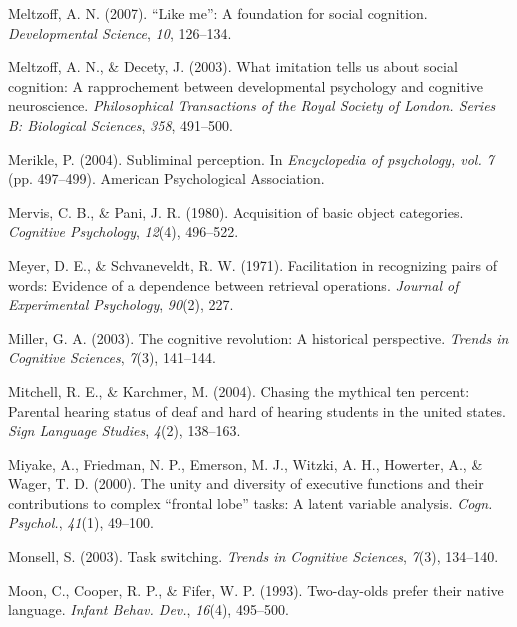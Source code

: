 \documentclass[
]{krantz}
\newlength{\cslhangindent}
\newenvironment{CSLReferences}[2] %
 {\begin{list}{}{%
  \setlength{\itemindent}{0pt}
  \setlength{\leftmargin}{0pt}
  \setlength{\parsep}{0pt}
  \ifodd #1
   \setlength{\leftmargin}{\cslhangindent}
   \setlength{\itemindent}{-1\cslhangindent}
  \fi
  \setlength{\itemsep}{#2\baselineskip}}}
 {\end{list}}
\begin{document}
\begin{CSLReferences}{1}{0}
Meltzoff, A. N. (2007). {``Like me''}: A foundation for social cognition. \emph{Developmental Science}, \emph{10}, 126--134.

Meltzoff, A. N., \& Decety, J. (2003). What imitation tells us about social cognition: A rapprochement between developmental psychology and cognitive neuroscience. \emph{Philosophical Transactions of the Royal Society of London. Series B: Biological Sciences}, \emph{358}, 491--500.

Merikle, P. (2004). Subliminal perception. In \emph{Encyclopedia of psychology, vol. 7} (pp. 497--499). American Psychological Association.

Mervis, C. B., \& Pani, J. R. (1980). Acquisition of basic object categories. \emph{Cognitive Psychology}, \emph{12}(4), 496--522.

Meyer, D. E., \& Schvaneveldt, R. W. (1971). Facilitation in recognizing pairs of words: Evidence of a dependence between retrieval operations. \emph{Journal of Experimental Psychology}, \emph{90}(2), 227.

Miller, G. A. (2003). The cognitive revolution: A historical perspective. \emph{Trends in Cognitive Sciences}, \emph{7}(3), 141--144.

Mitchell, R. E., \& Karchmer, M. (2004). Chasing the mythical ten percent: Parental hearing status of deaf and hard of hearing students in the united states. \emph{Sign Language Studies}, \emph{4}(2), 138--163.

Miyake, A., Friedman, N. P., Emerson, M. J., Witzki, A. H., Howerter, A., \& Wager, T. D. (2000). The unity and diversity of executive functions and their contributions to complex {``frontal lobe''} tasks: A latent variable analysis. \emph{Cogn. Psychol.}, \emph{41}(1), 49--100.

Monsell, S. (2003). Task switching. \emph{Trends in Cognitive Sciences}, \emph{7}(3), 134--140.

Moon, C., Cooper, R. P., \& Fifer, W. P. (1993). Two-day-olds prefer their native language. \emph{Infant Behav. Dev.}, \emph{16}(4), 495--500.


\end{CSLReferences}
\end{document}
